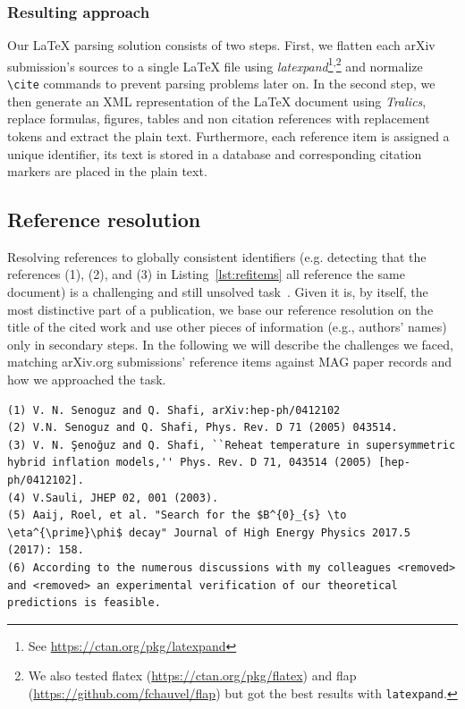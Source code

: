 \subsubsection{Resulting approach}
Our \LaTeX{} parsing solution consists of two steps. First, we flatten each arXiv submission's sources to a single \LaTeX{} file using \textit{latexpand}\footnote{See \url{https://ctan.org/pkg/latexpand}}\textsuperscript{,}\footnote{We also tested flatex (\url{https://ctan.org/pkg/flatex}) and flap (\url{https://github.com/fchauvel/flap}) but got the best results with \texttt{latexpand}.} and normalize \texttt{\textbackslash cite} commands to prevent parsing problems later on. In the second step, we then generate an XML representation of the \LaTeX{} document using \textit{Tralics}, replace formulas, figures, tables and non citation references with replacement tokens and extract the plain text. Furthermore, each reference item is assigned a unique identifier, its text is stored in a database and corresponding citation markers are placed in the plain text.

\subsection{Reference resolution}\label{sec:refresol}
Resolving references to globally consistent identifiers (e.g. detecting that the references (1), (2), and (3) in Listing~\ref{lst:refitems} all reference the same document) is a challenging and still unsolved task~\cite{Nasar2018}. Given it is, by itself, the most distinctive part of a publication, we base our reference resolution on the title of the cited work and use other pieces of information (e.g., authors' names) only in secondary steps. In the following we will describe the challenges we faced, matching arXiv.org submissions' reference items against MAG paper records and how we approached the task.

\begin{lstlisting}[caption={Examples of reference items.},label={lst:refitems}]
(1) V. N. Senoguz and Q. Shafi, arXiv:hep-ph/0412102
(2) V.N. Senoguz and Q. Shafi, Phys. Rev. D 71 (2005) 043514.
(3) V. N. Şenoğuz and Q. Shafi, ``Reheat temperature in supersymmetric hybrid inflation models,'' Phys. Rev. D 71, 043514 (2005) [hep-ph/0412102].
(4) V.Sauli, JHEP 02, 001 (2003).
(5) Aaij, Roel, et al. "Search for the $B^{0}_{s} \to \eta^{\prime}\phi$ decay" Journal of High Energy Physics 2017.5 (2017): 158.
(6) According to the numerous discussions with my colleagues <removed> and <removed> an experimental verification of our theoretical predictions is feasible.
\end{lstlisting} %

